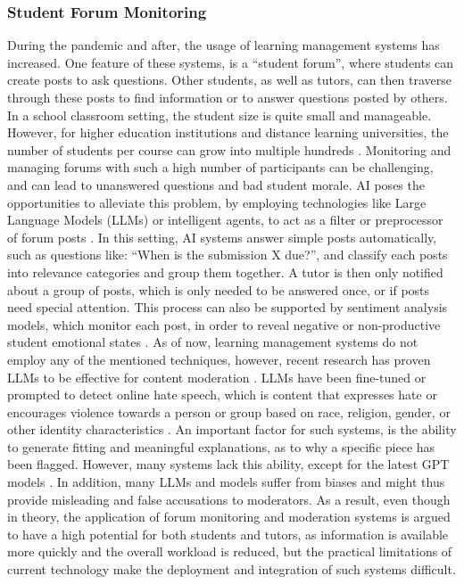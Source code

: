\documentclass{Academic}
\begin{document}
    \subsubsection{Student Forum Monitoring}
    During the pandemic and after, the usage of learning management systems has increased. One feature of these systems, is a \enquote{student forum}, where students can create posts to ask questions. Other students, as well as tutors, can then traverse through these posts to find information or to answer questions posted by others. In a school classroom setting, the student size is quite small and manageable. However, for higher education institutions and distance learning universities, the number of students per course can grow into multiple hundreds \cite{goel_using_2017}. Monitoring and managing forums with such a high number of participants can be challenging, and can lead to unanswered questions and bad student morale. AI poses the opportunities to alleviate this problem, by employing technologies like Large Language Models (LLMs) or intelligent agents, to act as a filter or preprocessor of forum posts \cite{goel_using_2017,holmes_artificial_2023}. In this setting, AI systems answer simple posts automatically, such as questions like: \enquote{When is the submission X due?}, and classify each posts into relevance categories and group them together. A tutor is then only notified about a group of posts, which is only needed to be answered once, or if posts need special attention. This process can also be supported by sentiment analysis models, which monitor each post, in order to reveal negative or non-productive student emotional states \cite{holmes_artificial_2023}. As of now, learning management systems do not employ any of the mentioned techniques, however, recent research has proven LLMs to be effective for content moderation \cite{wang_evaluating_2023}. LLMs have been fine-tuned or prompted to detect online hate speech, which is content that expresses hate or encourages violence towards a person or group based on race, religion, gender, or other identity characteristics \cite{wang_evaluating_2023}. An important factor for such systems, is the ability to generate fitting and meaningful explanations, as to why a specific piece has been flagged. However, many systems lack this ability, except for the latest GPT models \cite{wang_evaluating_2023}. In addition, many LLMs and models suffer from biases and might thus provide misleading and false accusations to moderators. As a result, even though in theory, the application of forum monitoring and moderation systems is argued to have a high potential for both students and tutors, as information is available more quickly and the overall workload is reduced, but the practical limitations of current technology make the deployment and integration of such systems difficult.
\end{document}
